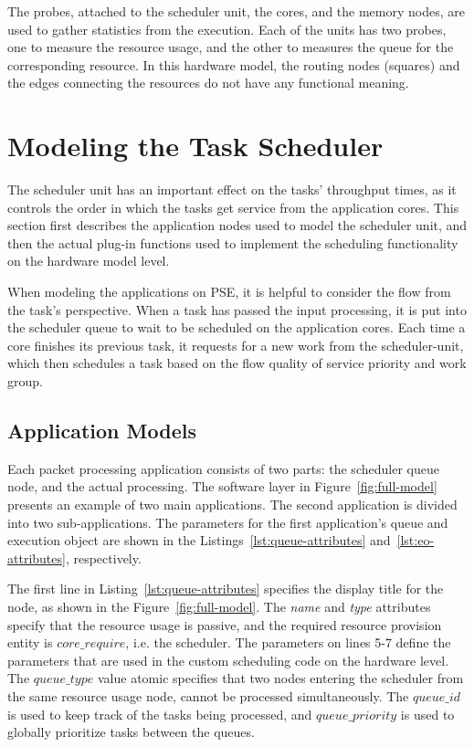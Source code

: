 The probes, attached to the scheduler unit, the cores, and the memory nodes, are used to gather statistics from the execution. Each of the units has two probes, one to measure the resource usage, and the other to measures the queue for the corresponding resource. In this hardware model, the routing nodes (squares) and the edges connecting the resources do not have any functional meaning.

\section{Modeling the Task Scheduler}
\label{sec:modeling-task-scheduler}
The scheduler unit has an important effect on the tasks' throughput times, as it controls the order in which the tasks get service from the application cores. This section first describes the application nodes used to model the scheduler unit, and then the actual plug-in functions used to implement the scheduling functionality on the hardware model level.

When modeling the applications on PSE, it is helpful to consider the flow from the task's perspective. When a task has passed the input processing, it is put into the scheduler queue to wait to be scheduled on the application cores. Each time a core finishes its previous task, it requests for a new work from the scheduler-unit, which then schedules a task based on the flow quality of service priority and work group.

\subsection{Application Models}
\label{application-models}

Each packet processing application consists of two parts: the scheduler queue node, and the actual processing. The software layer in Figure~\ref{fig:full-model} presents an example of two main applications. The second application is divided into two sub-applications. The parameters for the first application's queue and execution object are shown in the Listings~\ref{lst:queue-attributes} and~\ref{lst:eo-attributes}, respectively.



The first line in Listing~\ref{lst:queue-attributes} specifies the display title for the node, as shown in the Figure~\ref{fig:full-model}. The \emph{name} and \emph{type} attributes specify that the resource usage is passive, and the required resource provision entity is $core\_require$, i.e. the scheduler. The parameters on lines 5-7 define the parameters that are used in the custom scheduling code on the hardware level. The \emph{$queue\_type$} value atomic specifies that two nodes entering the scheduler from the same resource usage node, cannot be processed simultaneously. The \emph{$queue\_id$} is used to keep track of the tasks being processed, and \emph{$queue\_priority$} is used to globally prioritize tasks between the queues.

